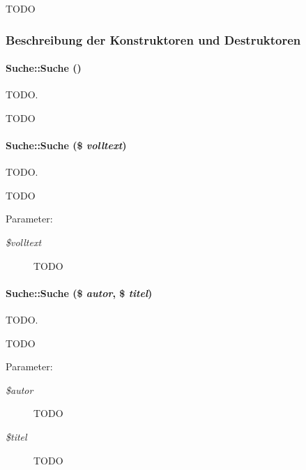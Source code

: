 TODO 



\subsubsection{Beschreibung der Konstruktoren und Destruktoren}
\hypertarget{classSuche_e863aff1c9abcb0308d5d3fdcdebb968}{
\paragraph[Suche]{\setlength{\rightskip}{0pt plus 5cm}Suche::Suche ()}\hfill}
\label{classSuche_e863aff1c9abcb0308d5d3fdcdebb968}


TODO. 

TODO \hypertarget{classSuche_05639fec18bd3193c01aafb08208ec94}{
\paragraph[Suche]{\setlength{\rightskip}{0pt plus 5cm}Suche::Suche (\$ {\em volltext})}\hfill}
\label{classSuche_05639fec18bd3193c01aafb08208ec94}


TODO. 

TODO \begin{Desc}
\item[Parameter:]
\begin{description}
\item[{\em \$volltext}]TODO \end{description}
\end{Desc}
\hypertarget{classSuche_4158769424a462492ac7821a0a30cf08}{
\paragraph[Suche]{\setlength{\rightskip}{0pt plus 5cm}Suche::Suche (\$ {\em autor}, \$ {\em titel})}\hfill}
\label{classSuche_4158769424a462492ac7821a0a30cf08}


TODO. 

TODO \begin{Desc}
\item[Parameter:]
\begin{description}
\item[{\em \$autor}]TODO \item[{\em \$titel}]TODO \end{description}
\end{Desc}


